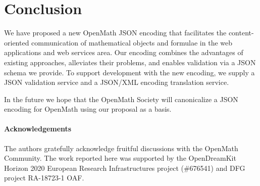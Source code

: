 \section{Conclusion}\label{sec:concl}

We have proposed a new OpenMath JSON encoding that facilitates the content-oriented communication of mathematical objects and formulae in the web applications and web services area. 
Our encoding combines the advantages of existing approaches, alleviates their problems, and enables validation via a JSON schema we provide. 
To support development with the new encoding, we supply a JSON validation service and a JSON/XML encoding translation service.

In the future we hope that the OpenMath Society will canonicalize a JSON encoding for OpenMath using our proposal as a basis. 

\paragraph*{Acknowledgements}
The authors gratefully acknowledge fruitful discussions with the OpenMath Community. 
The work reported here was supported by the OpenDreamKit Horizon 2020 European Research Infrastructures project (\#676541) and DFG project RA-18723-1 OAF.


